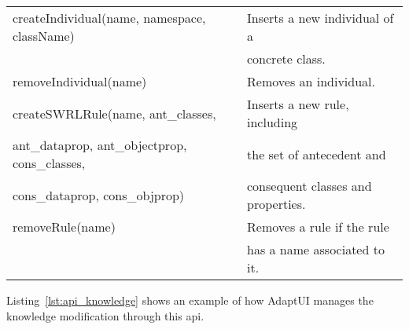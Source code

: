 \begin{center}
\begin{longtable}{l l}
  \hline 
  createIndividual(name, namespace, className)& Inserts a new individual of a \\
					& concrete class.		\\
  removeIndividual(name)	 	& Removes an individual.	\\

  \hline 
  createSWRLRule(name, ant\_classes, 	& Inserts a new rule, including	\\
  ant\_dataprop, ant\_objectprop, cons\_classes,& the set of antecedent and\\
  cons\_dataprop, cons\_objprop)	& consequent classes and properties.\\
  removeRule(name)	 		& Removes a rule if the rule 	\\
					& has a name associated to it.	\\
  \hline
\end{longtable}
\end{center}

Listing~\ref{lst:api_knowledge} shows an example of how AdaptUI manages the
knowledge modification through this \ac{api}. 


\inputminted[linenos=true, fontsize=\footnotesize, frame=lines]{java}{4_system_architecture/api_knowledge.java}
